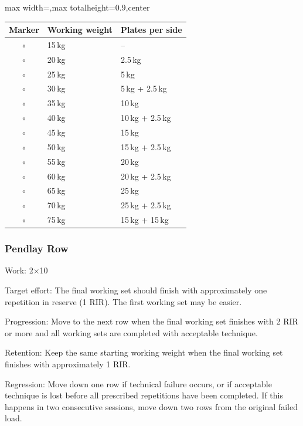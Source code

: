 \documentclass[11pt,a4paper]{article}
\newcommand{\tablearraystretch}{1.15}
\begin{document}
\begin{center}
\renewcommand{\arraystretch}{\tablearraystretch}
\begin{adjustbox}{max width=\linewidth,max totalheight=0.9\textheight,center}
\begin{tabular}{cll}
\toprule
Marker & Working weight & Plates per side \\
\midrule
$\circ$ & 15\,kg & -- \\
$\circ$ & 20\,kg & 2.5\,kg \\
$\circ$ & 25\,kg & 5\,kg \\
$\circ$ & 30\,kg & 5\,kg + 2.5\,kg \\
$\circ$ & 35\,kg & 10\,kg \\
$\circ$ & 40\,kg & 10\,kg + 2.5\,kg \\
$\circ$ & 45\,kg & 15\,kg \\
$\circ$ & 50\,kg & 15\,kg + 2.5\,kg \\
$\circ$ & 55\,kg & 20\,kg \\
$\circ$ & 60\,kg & 20\,kg + 2.5\,kg \\
$\circ$ & 65\,kg & 25\,kg \\
$\circ$ & 70\,kg & 25\,kg + 2.5\,kg \\
$\circ$ & 75\,kg & 15\,kg + 15\,kg \\
\bottomrule
\end{tabular}
\end{adjustbox}
\renewcommand{\arraystretch}{1}
\end{center}

\newpage
\subsubsection{Pendlay Row}

Work: 2$\times$10

Target effort: The final working set should finish with approximately one repetition in reserve (1 RIR). The first working set may be easier.

Progression: Move to the next row when the final working set finishes with 2 RIR or more and all working sets are completed with acceptable technique.

Retention: Keep the same starting working weight when the final working set finishes with approximately 1 RIR.

Regression: Move down one row if technical failure occurs, or if acceptable technique is lost before all prescribed repetitions have been completed. If this happens in two consecutive sessions, move down two rows from the original failed load.
\end{document}
